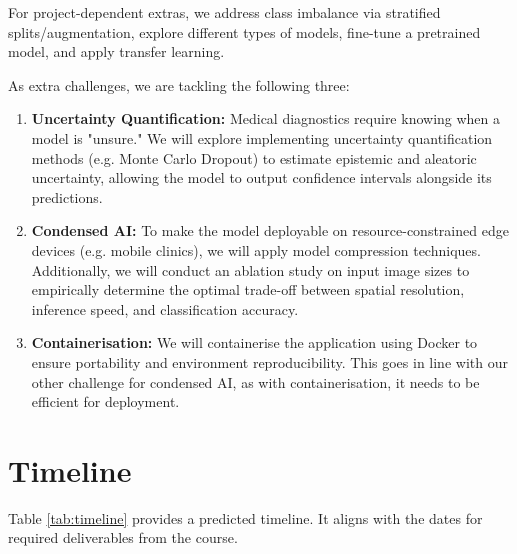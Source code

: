 \documentclass{article}
\begin{document}
For project-dependent extras, we address class imbalance via stratified splits/augmentation, explore different types of models, fine-tune a pretrained model, and apply transfer learning.

As extra challenges, we are tackling the following three:
\begin{enumerate}
    \item \textbf{Uncertainty Quantification:} Medical diagnostics require knowing when a model is "unsure." We will explore implementing uncertainty quantification methods (e.g. Monte Carlo Dropout) to estimate epistemic and aleatoric uncertainty, allowing the model to output confidence intervals alongside its predictions.
    \item \textbf{Condensed AI:} To make the model deployable on resource-constrained edge devices (e.g. mobile clinics), we will apply model compression techniques. Additionally, we will conduct an ablation study on input image sizes to empirically determine the optimal trade-off between spatial resolution, inference speed, and classification accuracy.
    \item \textbf{Containerisation:} We will containerise the application using Docker to ensure portability and environment reproducibility. This goes in line with our other challenge for condensed AI, as with containerisation, it needs to be efficient for deployment.
\end{enumerate}

\section{Timeline}

Table \ref{tab:timeline} provides a predicted timeline. It aligns with the dates for required deliverables from the course.
\end{document}
